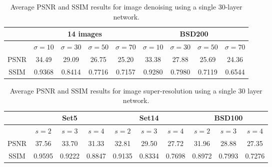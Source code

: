 \begin{table*}
\small
\centering
\caption{Average PSNR and SSIM results for image denoising using a single 30-layer network.}
\begin{tabular}{c|c c c c|c c c c} \hline
       &\multicolumn{4}{c|}{14 images}                      &\multicolumn{4}{c}{BSD200}                        \\ \hline
       &$\sigma=10$ &$\sigma=30$ &$\sigma=50$ &$\sigma=70$ &$\sigma=10$ &$\sigma=30$ &$\sigma=50$ &$\sigma=70$ \\ \hline
  PSNR &34.49       &29.09       &26.75       &25.20       &33.38       &27.88       &25.69       &24.36       \\ \hline
  SSIM &0.9368      &0.8414      &0.7716      &0.7157      &0.9280      &0.7980      &0.7119      &0.6544      \\ \hline
\end{tabular}
\label{table7}
\end{table*}

\begin{table*}
\small
\centering
\caption{Average PSNR and SSIM results for image super-resolution using a single 30 layer network.}
\begin{tabular}{c|c c c|c c c|c c c} \hline
       &\multicolumn{3}{c|}{Set5}    &\multicolumn{3}{c|}{Set14}   &\multicolumn{3}{c}{BSD100}   \\ \hline
       &$s = 2$  &$s = 3$  &$s = 4$  &$s = 2$  &$s = 3$  &$s = 4$  &$s = 2$  &$s = 3$  &$s = 4$  \\ \hline
  PSNR &37.56    &33.70    &31.33    &32.81    &29.50    &27.72    &31.96    &28.88    &27.35    \\ \hline
  SSIM &0.9595   &0.9222   &0.8847   &0.9135   &0.8334   &0.7698   &0.8972   &0.7993   &0.7276   \\ \hline
\end{tabular}
\label{table8}
\end{table*}





